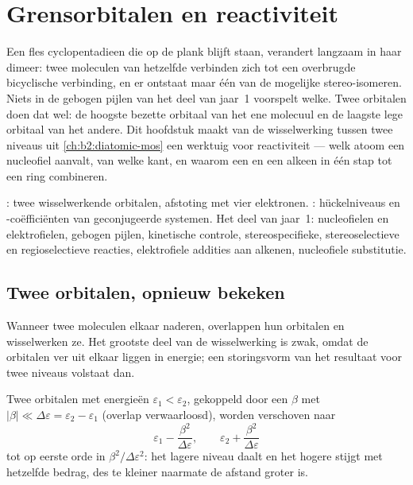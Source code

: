 \chapter{Grensorbitalen en reactiviteit}\label{ch:b2:frontier-orbitals}

Een fles cyclopentadieen die op de plank blijft staan, verandert langzaam in haar dimeer:
twee moleculen van hetzelfde  verbinden zich tot een overbrugde bicyclische verbinding, en
er ontstaat maar één van de mogelijke stereo-isomeren. Niets in de gebogen pijlen van
het deel van jaar~1 voorspelt welke. Twee orbitalen doen dat wel: de hoogste bezette
orbitaal van het ene molecuul en de laagste lege orbitaal van het andere. Dit
hoofdstuk maakt van de wisselwerking tussen twee niveaus uit \cref{ch:b2:diatomic-mos} een
werktuig voor reactiviteit --- welk atoom een nucleofiel aanvalt, van welke kant, en
waarom een  en een alkeen in één stap tot een ring combineren.

\begin{recall}
: twee wisselwerkende orbitalen, afstoting met vier elektronen.
: hückelniveaus en -coëfficiënten van geconjugeerde systemen.
Het deel van jaar~1: nucleofielen en elektrofielen, gebogen pijlen, kinetische
controle, stereospecifieke, stereoselectieve en regioselectieve reacties,
elektrofiele addities aan alkenen, nucleofiele substitutie.
\end{recall}

\section{Twee orbitalen, opnieuw bekeken}

Wanneer twee moleculen elkaar naderen, overlappen hun orbitalen en wisselwerken ze. Het grootste deel van
de wisselwerking is zwak, omdat de orbitalen ver uit elkaar liggen in energie; een storingsvorm van
het resultaat voor twee niveaus volstaat dan.

\begin{theorem}\label{thm:b2:frontier-orbitals:perturbation}
Twee orbitalen met energieën $\varepsilon_1 < \varepsilon_2$, gekoppeld door een 
$\beta$ met $|\beta| \ll \Delta\varepsilon = \varepsilon_2 - \varepsilon_1$ (overlap verwaarloosd), worden
verschoven naar
\[
  \varepsilon_1 - \frac{\beta^2}{\Delta\varepsilon}, \qquad \varepsilon_2 + \frac{\beta^2}{\Delta\varepsilon}
\]
tot op eerste orde in $\beta^2/\Delta\varepsilon^2$: het lagere niveau daalt en het hogere stijgt met hetzelfde
bedrag, des te kleiner naarmate de afstand groter is.
\end{theorem}

